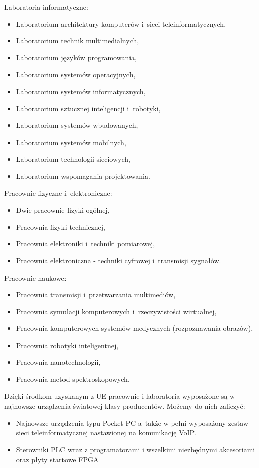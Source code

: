 \documentclass[a4paper,11pt]{article}
\begin{document}
\begin{itemize}
Laboratoria informatyczne:
\begin{itemize}
\item Laboratorium architektury komputerów i~sieci teleinformatycznych,
\item Laboratorium technik multimedialnych,
\item Laboratorium języków programowania,
\item Laboratorium systemów operacyjnych,
\item Laboratorium systemów informatycznych,
\item Laboratorium sztucznej inteligencji i~robotyki,
\item Laboratorium systemów wbudowanych,
\item Laboratorium systemów mobilnych,
\item Laboratorium technologii sieciowych,
\item Laboratorium wspomagania projektowania.
\end{itemize}
Pracownie fizyczne i~elektroniczne:
\begin{itemize}
\item Dwie pracownie fizyki ogólnej,
\item Pracownia fizyki technicznej,
\item Pracownia elektroniki i~techniki pomiarowej,
\item Pracownia elektroniczna - techniki cyfrowej i~transmisji sygnałów.
\end{itemize}
Pracownie naukowe:
\begin{itemize}
\item Pracownia transmisji i~przetwarzania multimediów,
\item Pracownia symulacji komputerowych i~rzeczywistości wirtualnej,
\item Pracownia komputerowych systemów medycznych (rozpoznawania obrazów),
\item Pracownia robotyki inteligentnej,
\item Pracownia nanotechnologii,
\item Pracownia metod spektroskopowych.
\end{itemize}
Dzięki środkom uzyskanym z UE pracownie i laboratoria wyposażone są w najnowsze urządzenia światowej
klasy producentów. Możemy do nich zaliczyć:
\begin{itemize}
\item Najnowsze urządzenia typu Pocket PC a~także w pełni wyposażony zestaw sieci teleinformatycznej
nastawionej na komunikację VoIP.
\item Sterowniki PLC wraz z programatorami i wszelkimi niezbędnymi akcesoriami oraz płyty startowe FPGA

\end{itemize}
\end{itemize}
\end{document}
